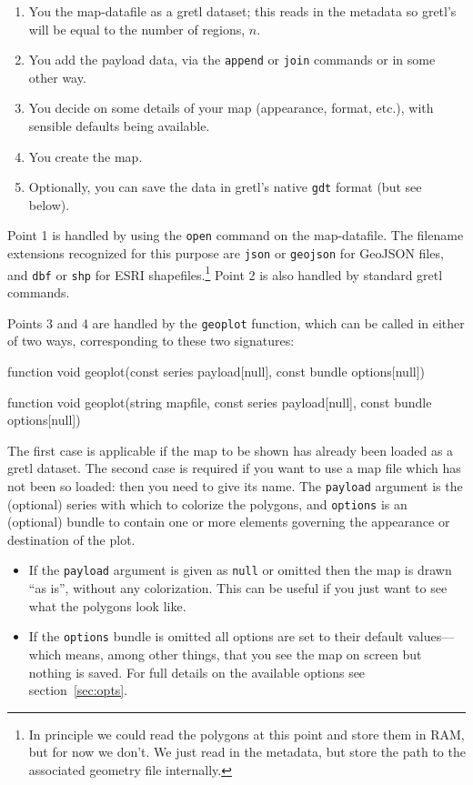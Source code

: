 \documentclass{article}
\begin{document}
\begin{enumerate}
\item You  the map-datafile as a gretl dataset; this reads
  in the metadata so gretl's  will be equal to the number
  of regions, $n$.
\item You add the payload data, via the \texttt{append} or
  \texttt{join} commands or in some other way.
\item You decide on some details of your map (appearance, format,
  etc.), with sensible defaults being available.
\item You create the map.
\item Optionally, you can save the data in gretl's native \texttt{gdt}
  format (but see below).
\end{enumerate}

Point 1 is handled by using the \texttt{open} command on the
map-datafile. The filename extensions recognized for this purpose are
\texttt{json} or \texttt{geojson} for GeoJSON files, and \texttt{dbf}
or \texttt{shp} for ESRI shapefiles.\footnote{In principle we could
  read the polygons at this point and store them in RAM, but for now
  we don't. We just read in the metadata, but store the path to the
  associated geometry file internally.} Point 2 is also handled by
standard gretl commands.

Points 3 and 4 are handled by the \texttt{geoplot} function, which can
be called in either of two ways, corresponding to these two signatures:
\begin{code}
function void geoplot(const series payload[null], const bundle options[null])

function void geoplot(string mapfile, const series payload[null],
                      const bundle options[null])
\end{code}
The first case is applicable if the map to be shown has already been
loaded as a gretl dataset. The second case is required if you want to
use a map file which has not been so loaded: then you need to give its
name. The \texttt{payload} argument is the (optional) series with
which to colorize the polygons, and \texttt{options} is an (optional)
bundle to contain one or more elements governing the appearance or
destination of the plot.
\begin{itemize}
\item If the \texttt{payload} argument is given as \texttt{null} or
  omitted then the map is drawn ``as is'', without any
  colorization. This can be useful if you just want to see what the
  polygons look like.
\item If the \texttt{options} bundle is omitted all options are set to
  their default values---which means, among other things, that you see
  the map on screen but nothing is saved. For full details on the
  available options see section~\ref{sec:opts}.
\end{itemize}
\end{document}
